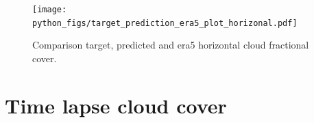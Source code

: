 \begin{figure}[ht]
    \centering
    \texttt{[image: python\_figs/target\_prediction\_era5\_plot\_horizonal.pdf]}
    \caption{Comparison target, predicted and era5 horizontal cloud fractional cover.}
    \label{fig:target_predict_era5_vertical}
\end{figure}




\cleardoublepage


\chapter{Time lapse cloud cover}

